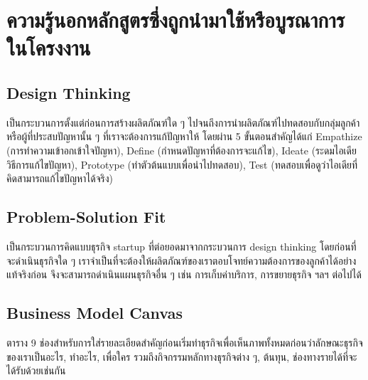 \section{ความรู้นอกหลักสูตรซึ่งถูกนำมาใช้หรือบูรณาการในโครงงาน}
\subsection{Design Thinking}
เป็นกระบวนการตั้งแต่ก่อนการสร้างผลิตภัณฑ์ใด ๆ ไปจนถึงการนำผลิตภัณฑ์ไปทดสอบกับกลุ่มลูกค้าหรือผู้ที่ประสบปัญหานั้น ๆ ที่เราจะต้องการแก้ปัญหาให้ โดยผ่าน 5 ขั้นตอนสำคัญได้แก่ Empathize (การทำความเข้าอกเข้าใจปัญหา), Define (กำหนดปัญหาที่ต้องการจะแก้ไข), Ideate (ระดมไอเดียวิธีการแก้ไขปัญหา), Prototype (ทำตัวต้นแบบเพื่อนำไปทดสอบ), Test (ทดสอบเพื่อดูว่าไอเดียที่คิดสามารถแก้ไขปัญหาได้จริง)

\subsection{Problem-Solution Fit}
เป็นกระบวนการคิดแบบธุรกิจ startup ที่ต่อยอดมาจากกระบวนการ design thinking โดยก่อนที่จะดำเนินธุรกิจใด ๆ เราจำเป็นที่จะต้องให้ผลิตภัณฑ์ของเราตอบโจทย์ความต้องการของลูกค้าได้อย่างแท้จริงก่อน จึงจะสามารถดำเนินแผนธุรกิจอื่น ๆ เช่น การเก็บค่าบริการ, การขยายธุรกิจ ฯลฯ ต่อไปได้

\subsection{Business Model Canvas}
ตาราง 9 ช่องสำหรับการใส่รายละเอียดสำคัญก่อนเริ่มทำธุรกิจเพื่อเห็นภาพทั้งหมดก่อนว่าลักษณะธุรกิจของเราเป็นอะไร, ทำอะไร, เพื่อใคร รวมถึงกิจกรรมหลักทางธุรกิจต่าง ๆ, ต้นทุน, ช่องทางรายได้ที่จะได้รับด้วยเช่นกัน